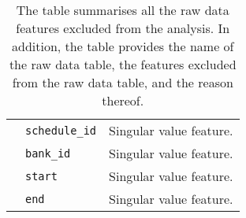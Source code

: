 \begin{sidewaystable}[ht]
\begin{adjustbox}{center}
\begin{tabular}{cll}
                                            & \texttt{schedule\_id}          & Singular value feature.                                                                                                                                                                                          \\
                                            & \texttt{bank\_id}              & Singular value feature.                                                                                                                                                                                          \\
                                            & \texttt{start}                 & Singular value feature.                                                                                                                                                                                          \\
                                            & \texttt{end}                   & Singular value feature.                                                                                                                                                                                         
\end{tabular}
\end{adjustbox}
\caption{The table summarises all the raw data features excluded from the analysis. In addition, the table provides the name of the raw data table, the features excluded from the raw data table, and the reason thereof.}
\label{tab:ch3_raw_features_removed}
\end{sidewaystable}

